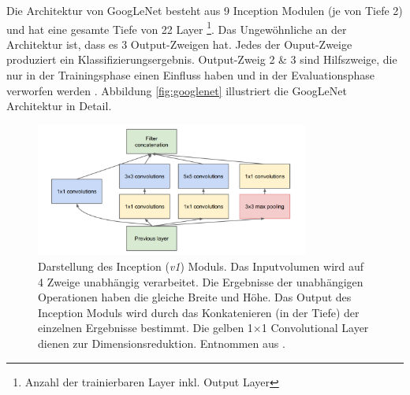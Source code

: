 Die Architektur von GoogLeNet besteht aus 9 Inception Modulen (je von Tiefe 2) und hat eine gesamte Tiefe von 22 Layer \footnote{Anzahl der trainierbaren Layer inkl. Output Layer}. Das Ungewöhnliche an der Architektur ist, dass es 3 Output-Zweigen hat. Jedes der Ouput-Zweige produziert ein Klassifizierungsergebnis. Output-Zweig 2 \& 3 sind Hilfszweige, die nur in der Trainingsphase einen Einfluss haben und in der Evaluationsphase verworfen werden \cite{szegedyGoingDeeperConvolutions2015}. Abbildung \ref{fig:googlenet} illustriert die GoogLeNet Architektur in Detail.

\vspace*{\fill}
 \begin{figure}[H]
	\centering
	\includegraphics[width=0.8\textwidth]{images/googlenet/inception_module.png}
	\caption{Darstellung des Inception (\textit{v1}) Moduls. Das Inputvolumen wird auf 4 Zweige unabhängig verarbeitet. Die Ergebnisse der unabhängigen Operationen haben die gleiche Breite und Höhe. Das Output des Inception Moduls wird durch das Konkatenieren (in der Tiefe) der einzelnen Ergebnisse bestimmt. Die gelben 1$\times$1 Convolutional Layer dienen zur Dimensionsreduktion. Entnommen aus \cite{szegedyGoingDeeperConvolutions2015}.}
	\label{fig:inception_module}
\end{figure}
\vspace*{\fill}
\pagebreak

